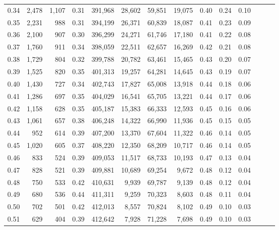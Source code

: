 \begin{tabular}{rrrrrrrrrrrrrr}
0.34 &   2,478 &  1,107 &  0.31 &  391,968 &   28,602 &  59,851 &  19,075 &  0.40 &  0.24 &      0.10 \\
0.35 &   2,231 &    988 &  0.31 &  394,199 &   26,371 &  60,839 &  18,087 &  0.41 &  0.23 &      0.09 \\
0.36 &   2,100 &    907 &  0.30 &  396,299 &   24,271 &  61,746 &  17,180 &  0.41 &  0.22 &      0.08 \\
0.37 &   1,760 &    911 &  0.34 &  398,059 &   22,511 &  62,657 &  16,269 &  0.42 &  0.21 &      0.08 \\
0.38 &   1,729 &    804 &  0.32 &  399,788 &   20,782 &  63,461 &  15,465 &  0.43 &  0.20 &      0.07 \\
0.39 &   1,525 &    820 &  0.35 &  401,313 &   19,257 &  64,281 &  14,645 &  0.43 &  0.19 &      0.07 \\
0.40 &   1,430 &    727 &  0.34 &  402,743 &   17,827 &  65,008 &  13,918 &  0.44 &  0.18 &      0.06 \\
0.41 &   1,286 &    697 &  0.35 &  404,029 &   16,541 &  65,705 &  13,221 &  0.44 &  0.17 &      0.06 \\
0.42 &   1,158 &    628 &  0.35 &  405,187 &   15,383 &  66,333 &  12,593 &  0.45 &  0.16 &      0.06 \\
0.43 &   1,061 &    657 &  0.38 &  406,248 &   14,322 &  66,990 &  11,936 &  0.45 &  0.15 &      0.05 \\
0.44 &     952 &    614 &  0.39 &  407,200 &   13,370 &  67,604 &  11,322 &  0.46 &  0.14 &      0.05 \\
0.45 &   1,020 &    605 &  0.37 &  408,220 &   12,350 &  68,209 &  10,717 &  0.46 &  0.14 &      0.05 \\
0.46 &     833 &    524 &  0.39 &  409,053 &   11,517 &  68,733 &  10,193 &  0.47 &  0.13 &      0.04 \\
0.47 &     828 &    521 &  0.39 &  409,881 &   10,689 &  69,254 &   9,672 &  0.48 &  0.12 &      0.04 \\
0.48 &     750 &    533 &  0.42 &  410,631 &    9,939 &  69,787 &   9,139 &  0.48 &  0.12 &      0.04 \\
0.49 &     680 &    536 &  0.44 &  411,311 &    9,259 &  70,323 &   8,603 &  0.48 &  0.11 &      0.04 \\
0.50 &     702 &    501 &  0.42 &  412,013 &    8,557 &  70,824 &   8,102 &  0.49 &  0.10 &      0.03 \\
0.51 &     629 &    404 &  0.39 &  412,642 &    7,928 &  71,228 &   7,698 &  0.49 &  0.10 &      0.03 \\

\end{tabular}
